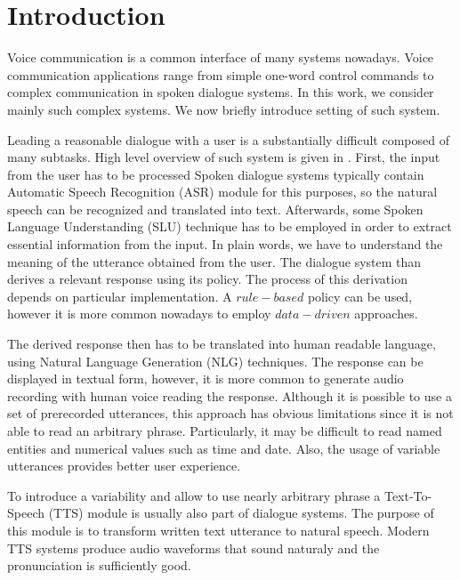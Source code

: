 \chapter{Introduction}
Voice communication is a common interface of many systems nowadays.
Voice communication applications range from simple one-word control commands to complex communication in spoken dialogue systems.
In this work, we consider mainly such complex systems.
We now briefly introduce setting of such system.
\par
Leading a reasonable dialogue with a user is a substantially difficult composed of many subtasks.
High level overview of such system is given in .
First, the input from the user has to be processed
Spoken dialogue systems typically contain Automatic Speech Recognition (ASR) module for this purposes, so the natural speech can be recognized and translated into text.
Afterwards, some Spoken Language Understanding (SLU) technique has to be employed in order to extract essential information from the input.
In plain words, we have to understand the meaning of the utterance obtained from the user.
The dialogue system than derives a relevant response using its policy.
The process of this derivation depends on particular implementation.
A $rule-based$ policy can be used, however it is more common nowadays to employ $data-driven$ approaches.
\par
The derived response then has to be translated into human readable language, using Natural Language Generation (NLG) techniques.
The response can be displayed in textual form, however, it is more common to generate audio recording with human voice reading the response.
Although it is possible to use a set of prerecorded utterances, this approach has obvious limitations since it is not able to read an arbitrary phrase.
Particularly, it may be difficult to read named entities and numerical values such as time and date.
Also, the usage of variable utterances provides better user experience.
\par
To introduce a variability and allow to use nearly arbitrary phrase a Text-To-Speech (TTS) module is usually also part of dialogue systems.
The purpose of this module is to transform written text utterance to natural speech.
Modern TTS systems produce audio waveforms that sound naturaly and the pronunciation is sufficiently good.
